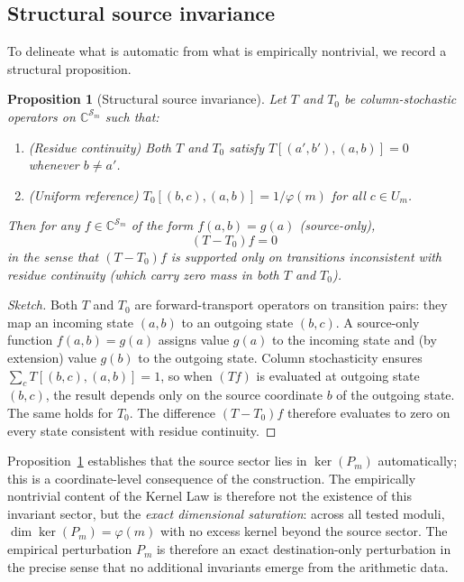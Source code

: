 \documentclass[11pt,a4paper]{article}
\newtheorem{proposition}{Proposition}
\begin{document}
\subsection{Structural source invariance}
\label{sec:structural}

To delineate what is automatic from what is empirically nontrivial, we record a structural proposition.

\begin{proposition}[Structural source invariance]
\label{prop:structural}
Let $T$ and $T_0$ be column-stochastic operators on $\mathbb{C}^{\mathcal{S}_m}$ such that:
\begin{enumerate}
\item (Residue continuity) Both $T$ and $T_0$ satisfy $T[(a',b'),(a,b)] = 0$ whenever $b \neq a'$.
\item (Uniform reference) $T_0[(b,c),(a,b)] = 1/\varphi(m)$ for all $c \in U_m$.
\end{enumerate}
Then for any $f \in \mathbb{C}^{\mathcal{S}_m}$ of the form $f(a,b) = g(a)$ (source-only),
\begin{equation}
(T - T_0) f = 0
\end{equation}
in the sense that $(T-T_0)f$ is supported only on transitions inconsistent with residue continuity (which carry zero mass in both $T$ and $T_0$).
\end{proposition}

\begin{proof}[Sketch]
Both $T$ and $T_0$ are forward-transport operators on transition pairs: they map an incoming state $(a,b)$ to an outgoing state $(b,c)$. A source-only function $f(a,b) = g(a)$ assigns value $g(a)$ to the incoming state and (by extension) value $g(b)$ to the outgoing state. Column stochasticity ensures $\sum_c T[(b,c),(a,b)] = 1$, so when $(T f)$ is evaluated at outgoing state $(b,c)$, the result depends only on the source coordinate $b$ of the outgoing state. The same holds for $T_0$. The difference $(T-T_0)f$ therefore evaluates to zero on every state consistent with residue continuity.
\end{proof}

Proposition~\ref{prop:structural} establishes that the source sector lies in $\ker(P_m)$ automatically; this is a coordinate-level consequence of the construction. The empirically nontrivial content of the Kernel Law is therefore not the existence of this invariant sector, but the \emph{exact dimensional saturation}: across all tested moduli, $\dim \ker(P_m) = \varphi(m)$ with no excess kernel beyond the source sector. The empirical perturbation $P_m$ is therefore an exact destination-only perturbation in the precise sense that no additional invariants emerge from the arithmetic data.
\end{document}
